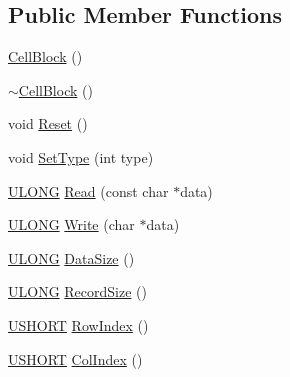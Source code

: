 \subsection*{Public Member Functions}
\begin{DoxyCompactItemize}
\item 
\hyperlink{struct_y_excel_1_1_worksheet_1_1_cell_table_1_1_row_block_1_1_cell_block_a2862ec10f23bcb27b01e777c9f24a131}{Cell\+Block} ()
\item 
\hyperlink{struct_y_excel_1_1_worksheet_1_1_cell_table_1_1_row_block_1_1_cell_block_aa9d35f00a3374308cc86e186af6abc6d}{$\sim$\+Cell\+Block} ()
\item 
void \hyperlink{struct_y_excel_1_1_worksheet_1_1_cell_table_1_1_row_block_1_1_cell_block_adc03a8eb5c3fac88ea6b0d37d3d4e38e}{Reset} ()
\item 
void \hyperlink{struct_y_excel_1_1_worksheet_1_1_cell_table_1_1_row_block_1_1_cell_block_a66f4f3b869319972e843107a6f445122}{Set\+Type} (int type)
\item 
\hyperlink{_basic_excel_8hpp_abe09d1bea023be6a07cbadde8e955435}{U\+L\+O\+N\+G} \hyperlink{struct_y_excel_1_1_worksheet_1_1_cell_table_1_1_row_block_1_1_cell_block_a6b92750bebf62ae79972ddba3052492d}{Read} (const char $\ast$data)
\item 
\hyperlink{_basic_excel_8hpp_abe09d1bea023be6a07cbadde8e955435}{U\+L\+O\+N\+G} \hyperlink{struct_y_excel_1_1_worksheet_1_1_cell_table_1_1_row_block_1_1_cell_block_a903a89a55e146541ee2efa2928301297}{Write} (char $\ast$data)
\item 
\hyperlink{_basic_excel_8hpp_abe09d1bea023be6a07cbadde8e955435}{U\+L\+O\+N\+G} \hyperlink{struct_y_excel_1_1_worksheet_1_1_cell_table_1_1_row_block_1_1_cell_block_a2fbfd04812e4d199cfd791f0b4927866}{Data\+Size} ()
\item 
\hyperlink{_basic_excel_8hpp_abe09d1bea023be6a07cbadde8e955435}{U\+L\+O\+N\+G} \hyperlink{struct_y_excel_1_1_worksheet_1_1_cell_table_1_1_row_block_1_1_cell_block_aa595d7da098fbf019d96dc87a5834f2c}{Record\+Size} ()
\item 
\hyperlink{_basic_excel_8hpp_a5850d5316caf7f4cedd742fdf8cd7c02}{U\+S\+H\+O\+R\+T} \hyperlink{struct_y_excel_1_1_worksheet_1_1_cell_table_1_1_row_block_1_1_cell_block_a45ace50415b5373371998f22b3037169}{Row\+Index} ()
\item 
\hyperlink{_basic_excel_8hpp_a5850d5316caf7f4cedd742fdf8cd7c02}{U\+S\+H\+O\+R\+T} \hyperlink{struct_y_excel_1_1_worksheet_1_1_cell_table_1_1_row_block_1_1_cell_block_ada5c175805d4960b8dda74a372d87c3e}{Col\+Index} ()

\end{DoxyCompactItemize}
